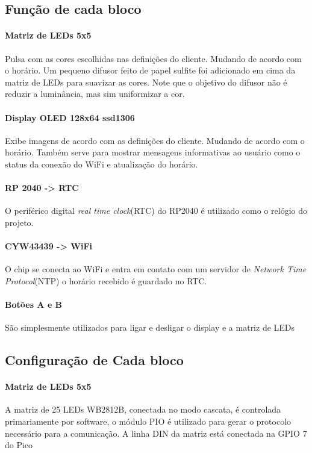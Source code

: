 \documentclass[12pt]{article}
\begin{document}
\subsection{Função de cada bloco}

\paragraph{Matriz de LEDs 5x5}

Pulsa com as cores escolhidas nas definições do cliente. Mudando de acordo com o horário. Um pequeno difusor feito de papel sulfite foi adicionado em cima da matriz de LEDs para suavizar as cores. Note que o objetivo do difusor não é reduzir a luminância, mas sim uniformizar a cor.

\paragraph{Display OLED 128x64 ssd1306}
Exibe imagens de acordo com as definições do cliente. Mudando de acordo com o horário. Também serve para mostrar mensagens informativas ao usuário como o status da conexão do WiFi e atualização do horário. 

\paragraph{RP 2040 -> RTC}
O periférico digital \textit{real time clock}(RTC) do RP2040 é utilizado como o relógio do projeto.

\paragraph{CYW43439 -> WiFi}
O chip se conecta ao WiFi e entra em contato com um servidor de \textit{Network Time Protocol}(NTP) o horário recebido é guardado no RTC.

\paragraph{Botões A e B}
São simplesmente utilizados para ligar e desligar o display e a matriz de LEDs

\subsection{Configuração de Cada bloco}

\paragraph{Matriz de LEDs 5x5}
A matriz de 25 LEDs WB2812B, conectada no modo cascata, é controlada primariamente por software, o módulo PIO é utilizado para gerar o protocolo necessário para a comunicação. A linha DIN da matriz está conectada na GPIO 7 do Pico
\end{document}
